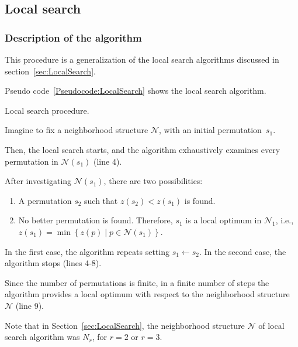 \subsection{Local search}

\subsubsection{Description of the algorithm}

This procedure is a generalization of the local search algorithms discussed in section~\ref{sec:LocalSearch}. 

Pseudo code~\ref{Pseudocode:LocalSearch} shows the local search algorithm. 


\begin{algorithm}\footnotesize
	\caption{Local search procedure.}
	\label{Pseudocode:LocalSearch}
\end{algorithm}


Imagine to fix a neighborhood structure $\mathcal N$, with an initial permutation~$s_1$.

Then, the local search starts, and the algorithm exhaustively examines every permutation in $\mathcal N(s_1)$ (line 4).

After investigating $\mathcal N(s_1)$, there are two possibilities:
\begin{enumerate}
	\item A permutation $s_2$ such that $z(s_2)<z(s_1)$ is found.
	\item No better permutation is found. Therefore,  $s_1$ is a local optimum in $\mathcal N_1$, i.e.,  $z(s_1)=\min\left\{z(p) \mid p \in \mathcal N(s_1)\right\}$.
\end{enumerate}

In the first case, the algorithm repeats setting $s_1 \gets s_2$. In the second case, the algorithm stops (lines 4-8).

Since the number of permutations is finite, in a finite number of steps the algorithm provides a local optimum with respect to the neighborhood structure $\mathcal N$ (line 9).

Note that in Section~\ref{sec:LocalSearch}, the neighborhood structure $\mathcal N$ of local search algorithm was $N_r$, for $r=2$ or $r=3$.




